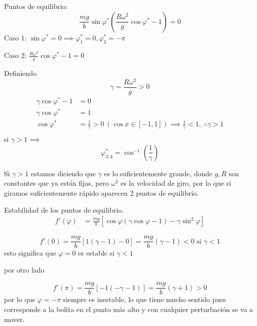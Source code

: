 Puntos de equilibrio:
$$
  \frac{mg}{b}\sin \varphi^* \left( \frac{R\omega^2}{g}\cos\varphi^{*}-1 \right)=0  
$$
Caso 1: $\sin\varphi^{*}=0 \implies \varphi_1^{*}=0 , \varphi_2^{*}=-\pi $

Caso 2: $\frac{R\omega^2}{g}\cos\varphi^{*}-1=0$

Definiendo  $$
\gamma=\frac{R\omega^2}{g} >0
$$
$$
\begin{aligned}
  \gamma\cos\varphi^{*}-1 &= 0 \\
  \gamma \cos\varphi^{*}&=1  \\ 
  \cos\varphi^{*}&=\frac{1}{\gamma}>0 \ (\cos x \in [-1,1]  ) \implies \frac{1}{\gamma}<1 , \ \therefore \gamma>1	\\
\end{aligned}
$$
si $\gamma>1 \implies$ $$\varphi_{3,4}^{*}=\cos^{-1} \left( \frac{1}{\gamma} \right) $$

\begin{tcolorbox}[colback=Black!4,colframe=White] 
\begin{nota}
  Si $\gamma>1$ estamos diciendo que $\gamma $ es lo suficientemente grande, donde $g,R$ son constantes que ya están fijas, pero $\omega^2$ es la velocidad de giro, por lo que si giramos suficientemente rápido aparecen 2 puntos de equilibrio.
  
\end{nota}
\end{tcolorbox}

Estabilidad de los puntos de equilibrio.
$$
\begin{aligned}
  f'(\varphi)&=\frac{mg}{b} \left[ \cos\varphi(\gamma\cos\varphi-1)-\gamma\sin^2\varphi \right]  
\end{aligned}
$$

$$
f'(0)=\frac{mg}{b} \left[ 1(\gamma-1)-0 \right] =\frac{mg}{b}(\gamma-1)<0 \text{ si } \gamma<1
$$
esto significa que $\varphi=0$ es estable si $\gamma<1$

por otro lado

$$
f'(\pi)=\frac{mg}{b} \left[ -1(-\gamma-1) \right] = \frac{mg}{b}(\gamma+1) > 0 
$$
por lo que $\varphi=-\pi$ siempre es inestable, lo que tiene mucho sentido pues corresponde a la bolita en el punto más alto y con cualquier perturbación se va a mover.

